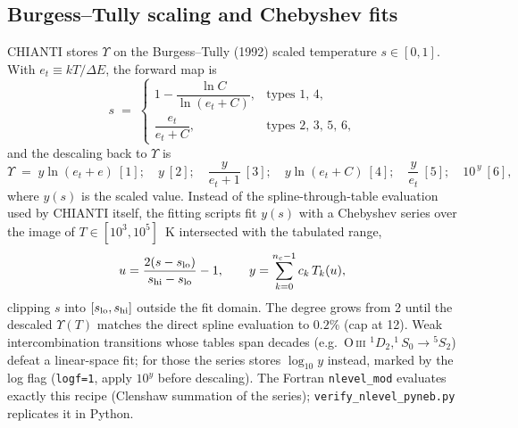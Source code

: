 \documentclass[english,a4paper]{my_memo}
\newcommand{\code}[1]{\texttt{#1}}
\begin{document}
\subsection{Burgess--Tully scaling and Chebyshev fits}
CHIANTI stores $\Upsilon$ on the Burgess--Tully (1992) scaled temperature
$s\in[0,1]$.  With $e_t \equiv kT/\Delta E$, the forward map is
\begin{equation}
  s \;=\;
  \begin{cases}
    1 - \dfrac{\ln C}{\ln(e_t + C)}, & \text{types 1, 4},\\[8pt]
    \dfrac{e_t}{e_t + C}, & \text{types 2, 3, 5, 6},
  \end{cases}
\end{equation}
and the descaling back to $\Upsilon$ is
\begin{equation}
  \Upsilon \;=\; y\ln(e_t+e)~[1];\quad y~[2];\quad
  \frac{y}{e_t+1}~[3];\quad y\ln(e_t+C)~[4];\quad
  \frac{y}{e_t}~[5];\quad 10^{\,y}~[6],
\end{equation}
where $y(s)$ is the scaled value.  Instead of the spline-through-table
evaluation used by CHIANTI itself, the fitting scripts fit $y(s)$ with a
Chebyshev series over the image of $T\in[10^3,10^5]$~K intersected with
the tabulated range,
\begin{equation}
  u = \frac{2(s - s_{\rm lo})}{s_{\rm hi}-s_{\rm lo}} - 1,\qquad
  y = \sum_{k=0}^{n_c-1} c_k\, T_k(u),
\end{equation}
clipping $s$ into $[s_{\rm lo}, s_{\rm hi}]$ outside the fit domain.  The
degree grows from 2 until the descaled $\Upsilon(T)$ matches the direct
spline evaluation to $0.2\%$ (cap at 12).  Weak intercombination
transitions whose tables span decades (e.g.\ O\,\textsc{iii}
$^1\!D_2,^1\!S_0 \rightarrow {}^5\!S_2$) defeat a linear-space fit; for
those the series stores $\log_{10} y$ instead, marked by the log flag
(\code{logf=1}, apply $10^{y}$ before descaling).  The Fortran
\code{nlevel\_mod} evaluates exactly this recipe (Clenshaw summation of
the series); \code{verify\_nlevel\_pyneb.py} replicates it in Python.
\end{document}
